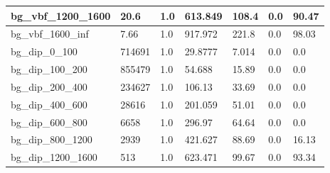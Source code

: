\documentclass[a4paper, 10pt]{article}
\begin{document}
\begin{table}[H]
\begin{center}
\begin{tabular}{|m{23.0mm}|m{23.0mm}|m{18.0mm}|m{19.0mm}|m{19.0mm}|m{19.0mm}|m{19.0mm}|}
      \hline
      {\cellcolor{white}         bg\_vbf\_1200\_1600}& {\cellcolor{white}         20.6}& {\cellcolor{white}         1.0}& {\cellcolor{white}         613.849}& {\cellcolor{white}         108.4}& {\cellcolor{red}         0.0}& {\cellcolor{red}         90.47}\\
      \hline
      {\cellcolor{white}         bg\_vbf\_1600\_inf}& {\cellcolor{white}         7.66}& {\cellcolor{white}         1.0}& {\cellcolor{white}         917.972}& {\cellcolor{white}         221.8}& {\cellcolor{red}         0.0}& {\cellcolor{red}         98.03}\\
      \hline
      {\cellcolor{white}         bg\_dip\_0\_100}& {\cellcolor{white}         714691}& {\cellcolor{white}         1.0}& {\cellcolor{white}         29.8777}& {\cellcolor{white}         7.014}& {\cellcolor{green}         0.0}& {\cellcolor{green}         0.0}\\
      \hline
      {\cellcolor{white}         bg\_dip\_100\_200}& {\cellcolor{white}         855479}& {\cellcolor{white}         1.0}& {\cellcolor{white}         54.688}& {\cellcolor{white}         15.89}& {\cellcolor{green}         0.0}& {\cellcolor{green}         0.0}\\
      \hline
      {\cellcolor{white}         bg\_dip\_200\_400}& {\cellcolor{white}         234627}& {\cellcolor{white}         1.0}& {\cellcolor{white}         106.13}& {\cellcolor{white}         33.69}& {\cellcolor{green}         0.0}& {\cellcolor{green}         0.0}\\
      \hline
      {\cellcolor{white}         bg\_dip\_400\_600}& {\cellcolor{white}         28616}& {\cellcolor{white}         1.0}& {\cellcolor{white}         201.059}& {\cellcolor{white}         51.01}& {\cellcolor{green}         0.0}& {\cellcolor{green}         0.0}\\
      \hline
      {\cellcolor{white}         bg\_dip\_600\_800}& {\cellcolor{white}         6658}& {\cellcolor{white}         1.0}& {\cellcolor{white}         296.97}& {\cellcolor{white}         64.64}& {\cellcolor{green}         0.0}& {\cellcolor{green}         0.0}\\
      \hline
      {\cellcolor{white}         bg\_dip\_800\_1200}& {\cellcolor{white}         2939}& {\cellcolor{white}         1.0}& {\cellcolor{white}         421.627}& {\cellcolor{white}         88.69}& {\cellcolor{red}         0.0}& {\cellcolor{red}         16.13}\\
      \hline
      {\cellcolor{white}         bg\_dip\_1200\_1600}& {\cellcolor{white}         513}& {\cellcolor{white}         1.0}& {\cellcolor{white}         623.471}& {\cellcolor{white}         99.67}& {\cellcolor{red}         0.0}& {\cellcolor{red}         93.34}\\

\end{tabular}
\end{center}
\end{table}
\end{document}
